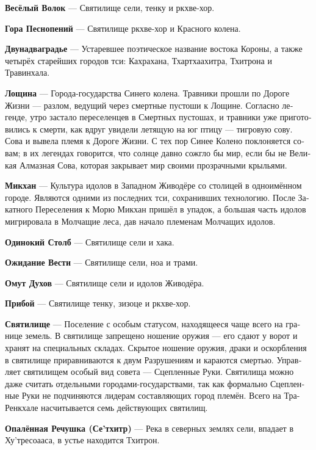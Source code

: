 \documentclass[a4paper,12pt,fleqn]{book}\usepackage{polyglossia}\setdefaultlanguage[babelshorthands=true]{russian}\setotherlanguage{english}\defaultfontfeatures{Ligatures=TeX,Mapping=tex-text}\usepackage{xcolor}\newcommand{\ml}[3]{#2}
\newcommand{\asterism}{\vspace{1em}{\centering\Large\bfseries$\ast~\ast~\ast$\par}\vspace{1em}}
\newcommand{\theterm}[3]{\textbf{\hypertarget{#1}{#2}} --- #3}
\begin{document}
\asterism

\theterm{sanct3}
{Весёлый Волок}
{Святилище сели, тенку и ркхве-хор.}

\theterm{sanct6}
{Гора Песнопений}
{Святилище ркхве-хор и Красного колена.}

\theterm{two-and-two-cities}
{Двунадваградье}
{Устаревшее поэтическое название востока Короны, а также четырёх старейших городов тси: Кахрахана, Тхартхаахитра, Тхитрона и Травинхала.}

\theterm{deepdale}
{Лощина}
{Города-государства Синего колена.
Травники прошли по Дороге Жизни --- разлом, ведущий через смертные пустоши к Лощине.
Согласно легенде, утро застало переселенцев в Смертных пустошах, и травники уже приготовились к смерти, как вдруг увидели летящую на юг птицу --- тигровую сову.
Сова и вывела племя к Дороге Жизни.
С тех пор Синее Колено поклоняется совам;
в их легендах говорится, что солнце давно сожгло бы мир, если бы не Великая Алмазная Сова, которая закрывает мир своими прозрачными крыльями.}

\theterm{mikchan}
{Микхан}
{Культура идолов в Западном Живодёре со столицей в одноимённом городе.
Являются одними из последних тси, сохранивших технологию.
После Закатного Переселения к Морю Микхан пришёл в упадок, а большая часть идолов мигрировала в Молчащие леса, дав начало племенам Молчащих идолов.}

\theterm{sanct4}
{Одинокий Столб}
{Святилище сели и хака.}

\theterm{sanct5}
{Ожидание Вести}
{Святилище сели, ноа и трами.}

\theterm{sanct1}
{Омут Духов}
{Святилище сели и идолов Живодёра.}

\theterm{sanct7}
{Прибой}
{Святилище тенку, зизоце и ркхве-хор.}

\theterm{sanctuary}
{Святилище}
{Поселение с особым статусом, находящееся чаще всего на границе земель.
В святилище запрещено ношение оружия --- его сдают у ворот и хранят на специальных складах.
Скрытое ношение оружия, драки и оскорбления в святилище приравниваются к двум Разрушениям и караются смертью.
Управляет святилищем особый вид совета --- Сцепленные Руки.
Святилища можно даже считать отдельными городами-государствами, так как формально Сцепленные Руки не подчиняются лидерам составляющих город племён.
Всего на Тра-Ренкхале насчитывается семь действующих святилищ.}

\theterm{se-tchitr}
{Опалённая Речушка (Се'тхитр)}
{Река в северных землях сели, впадает в Ху'тресоааса, в устье находится Тхитрон.}
\end{document}
